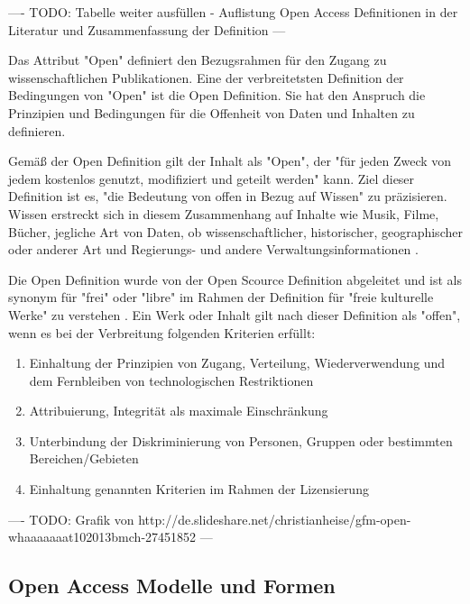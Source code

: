 ---- TODO: Tabelle weiter ausfüllen - Auflistung Open Access Definitionen in der Literatur und
Zusammenfassung der Definition ---

Das Attribut "Open" definiert den Bezugsrahmen für den Zugang zu wissenschaftlichen Publikationen. Eine der verbreitetsten Definition der Bedingungen von "Open" ist die Open Definition. Sie hat den Anspruch die Prinzipien und Bedingungen für die Offenheit von Daten und Inhalten zu definieren.

Gemäß der Open Definition gilt der Inhalt als "Open", der "für jeden Zweck von jedem kostenlos genutzt, modifiziert und geteilt werden" \cite{open_definition} kann. Ziel dieser Definition ist es, "die Bedeutung von offen in Bezug auf Wissen" zu präzisieren. Wissen erstreckt sich in diesem Zusammenhang auf Inhalte wie Musik, Filme, Bücher, jegliche Art von Daten, ob wissenschaftlicher, historischer, geographischer oder anderer Art und Regierungs- und andere Verwaltungsinformationen \cite{open_definition}.

Die Open Definition wurde von der Open Scource Definition abgeleitet und ist als synonym für "frei" oder "libre" im Rahmen der Definition für "freie kulturelle Werke" zu verstehen \cite{suchen}. Ein Werk oder Inhalt gilt nach dieser Definition als "offen", wenn es bei der Verbreitung folgenden Kriterien erfüllt:
\begin{enumerate}
\item Einhaltung der Prinzipien von Zugang, Verteilung, Wiederverwendung und dem Fernbleiben von technologischen Restriktionen
\item Attribuierung, Integrität als maximale Einschränkung
\item Unterbindung der Diskriminierung von Personen, Gruppen oder bestimmten Bereichen/Gebieten
\item Einhaltung genannten Kriterien  im Rahmen der Lizensierung
\end{enumerate}

---- TODO: Grafik von http://de.slideshare.net/christianheise/gfm-open-whaaaaaaat102013bmch-27451852 ---

\subsection{Open Access Modelle und Formen}

